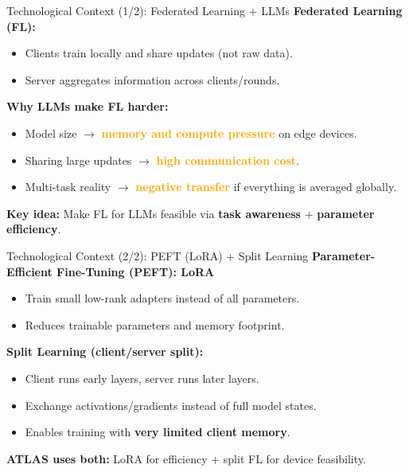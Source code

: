 \documentclass[aspectratio=169]{beamer}
\newcommand{\hl}[1]{\textcolor{cnamred}{\textbf{#1}}}
\newcommand{\warn}[1]{\textcolor{orange}{\textbf{#1}}}
\begin{document}
\begin{frame}{Technological Context (1/2): Federated Learning + LLMs}
\textbf{Federated Learning (FL):}
\begin{itemize}
  \item Clients train locally and share updates (not raw data).
  \item Server aggregates information across clients/rounds.
\end{itemize}

\vspace{0.3cm}
\textbf{Why LLMs make FL harder:}
\begin{itemize}
  \item Model size $\rightarrow$ \warn{memory and compute pressure} on edge devices.
  \item Sharing large updates $\rightarrow$ \warn{high communication cost}.
  \item Multi-task reality $\rightarrow$ \warn{negative transfer} if everything is averaged globally.
\end{itemize}

\vspace{0.3cm}
\textbf{Key idea:} Make FL for LLMs feasible via \hl{task awareness} + \hl{parameter efficiency}.
\end{frame}

\begin{frame}{Technological Context (2/2): PEFT (LoRA) + Split Learning}
\textbf{Parameter-Efficient Fine-Tuning (PEFT): LoRA}
\begin{itemize}
  \item Train small low-rank adapters instead of all parameters.
  \item Reduces trainable parameters and memory footprint.
\end{itemize}

\vspace{0.3cm}
\textbf{Split Learning (client/server split):}
\begin{itemize}
  \item Client runs early layers, server runs later layers.
  \item Exchange activations/gradients instead of full model states.
  \item Enables training with \hl{very limited client memory}.
\end{itemize}

\vspace{0.3cm}
\textbf{ATLAS uses both:} LoRA for efficiency + split FL for device feasibility.
\end{frame}
\end{document}
